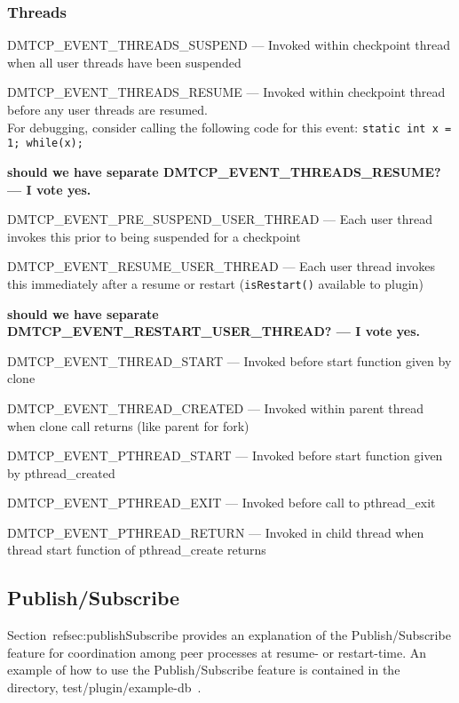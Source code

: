 \documentclass{article}
\begin{document}
\subsubsection*{Threads}
\begin{list}{}{\leftmargin=3em \itemindent=-2em}
\item
  DMTCP\_EVENT\_THREADS\_SUSPEND --- Invoked within checkpoint thread
	when all user threads have been suspended
\item
  DMTCP\_EVENT\_THREADS\_RESUME --- Invoked within checkpoint thread before
	any user threads are resumed. \\
	For debugging, consider calling the following code for this
        event:  {\tt static int x = 1; while(x);}
\item
  {\bf should we have separate DMTCP\_EVENT\_THREADS\_RESUME?  --- I vote yes.}
\item
  DMTCP\_EVENT\_PRE\_SUSPEND\_USER\_THREAD --- Each user thread invokes this prior
	to being suspended for a checkpoint
\item
  DMTCP\_EVENT\_RESUME\_USER\_THREAD --- Each user thread invokes this immediately
	after a resume or restart ({\tt isRestart()} available to plugin)
\item
  {\bf should we have separate DMTCP\_EVENT\_RESTART\_USER\_THREAD?  --- I vote yes.}
\item
  DMTCP\_EVENT\_THREAD\_START --- Invoked before start function given by clone
\item
  DMTCP\_EVENT\_THREAD\_CREATED --- Invoked within parent thread when clone call returns  (like parent for fork)
\item
  DMTCP\_EVENT\_PTHREAD\_START --- Invoked before start function given by pthread\_created
\item
  DMTCP\_EVENT\_PTHREAD\_EXIT --- Invoked before call to pthread\_exit
\item
  DMTCP\_EVENT\_PTHREAD\_RETURN --- Invoked in child thread when thread start function of pthread\_create returns
\item
\end{list}

\subsection{Publish/Subscribe}

Section~ref{sec:publishSubscribe} provides an explanation of the Publish/Subscribe
feature for coordination among peer processes at resume- or restart-time.
An example of how to use the Publish/Subscribe feature is contained
in the directory, test/plugin/example-db~.
\end{document}
